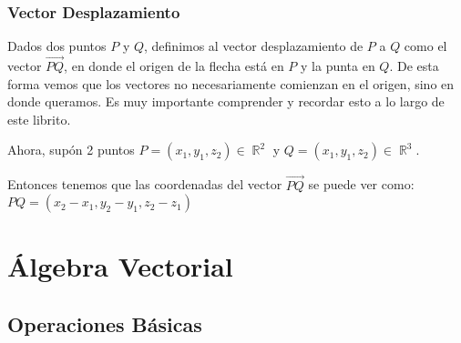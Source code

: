 \documentclass[12pt, fleqn]{report}                             %
\DeclareMathOperator \Reals        {\mathbb{R}}                 %
\newcommand{\lVec}[1]{\overrightarrow{#1}}                      %
\begin{document}
            \subsection{Vector Desplazamiento}
            
                Dados dos puntos $P$ y $Q$, definimos al vector desplazamiento de $P$ a $Q$ como el
                vector $\lVec{PQ}$, en donde el origen de la flecha está en $P$ y la punta en $Q$.
                De esta forma vemos que los vectores no necesariamente comienzan en el origen,
                sino en donde queramos. Es muy importante comprender y recordar esto a lo largo
                de este librito.

                Ahora, supón 2 puntos $P = (x_1, y_1, z_2) \in \Reals^2$ y $Q = (x_1, y_1, z_2) \in \Reals^3$.

                Entonces tenemos que las coordenadas del vector $\lVec{PQ}$ se puede ver como:\\
                $PQ = (x_2 - x_1, y_2 - y_1, z_2 - z_1)$









    \chapter{Álgebra Vectorial}
            
        

        \clearpage
        \section{Operaciones Básicas}
            
\end{document}
